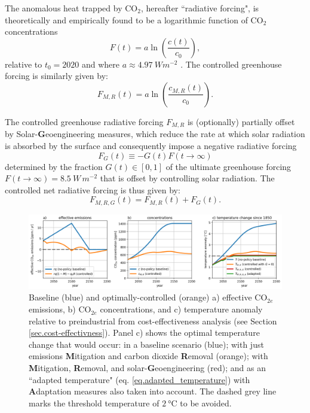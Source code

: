 \documentclass{article}
\begin{document}
The anomalous heat trapped by CO$_{2}$, hereafter ``radiative forcing", is theoretically and empirically found to be a logarithmic function of CO$_{2}$ concentrations
\begin{equation}
    F(t) = a \ln(\frac{c(t)}{c_{0}}),
\end{equation}
relative to $t_{0} = 2020$ and where $a \approx \SI{4.97}{W m^{-2}}$ \citep{geoffroy_transient_2012}. The controlled greenhouse forcing is similarly given by:
\begin{equation}
    F_{M, R}(t) = a \ln(\frac{c_{M, R}(t)}{c_{0}}).
\end{equation}

The controlled greenhouse radiative forcing $F_{M, R}$ is (optionally) partially offset by Solar-\textbf{G}eoengineering measures, which reduce the rate at which solar radiation is absorbed by the surface and consequently impose a negative radiative forcing
\begin{equation}
F_{G}(t) \equiv -G(t)F(t \rightarrow \infty)
\end{equation}
determined by the fraction $G(t) \in [0,1]$ of the ultimate greenhouse forcing  $F(t \rightarrow \infty) = \SI{8.5}{W\, m^{-2}}$ that is offset by controlling solar radiation. The controlled net radiative forcing is thus given by:
\begin{equation}
    F_{M, R, G}(t) = F_{M, R}(t) + F_{G}(t).
\end{equation}

\begin{figure}[htb!]
\noindent\includegraphics[width=1.0\textwidth]{figures/default-temp_carbon_and_temperatures.png}
\centering
\caption{Baseline (blue) and optimally-controlled (orange) a) effective CO$_{2e}$ emissions, b) CO$_{2e}$ concentrations, and c) temperature anomaly relative to preindustrial from cost-effectiveness analysis (see Section \ref{sec.cost-effectivness}). Panel c) shows the optimal temperature change that would occur: in a baseline scenario (blue); with just emissions \textbf{M}itigation and carbon dioxide \textbf{R}emoval (orange); with \textbf{M}itigation, \textbf{R}emoval, and solar-\textbf{G}eoengineering (red); and as an ``adapted temperature" (eq. \ref{eq.adapted_temperature}) with \textbf{A}daptation measures also taken into account. The dashed grey line marks the threshold temperature of $\SI{2}{\celsius}$ to be avoided.}
\label{fig.temp_and_carbon}
\end{figure}
\end{document}
